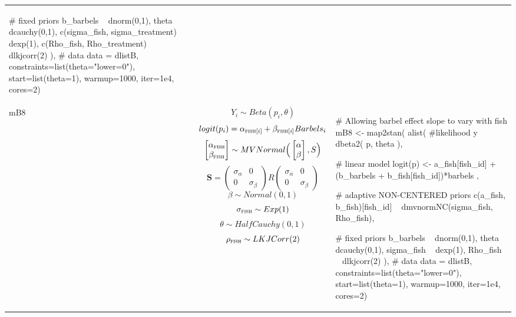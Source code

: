 \begin{longtable}{p{} |p{} |p{} }
{\begin{mylist}
    # fixed priors
    b_barbels ~ dnorm(0,1),
    theta ~ dcauchy(0,1),
    c(sigma_fish, sigma_treatment) ~ dexp(1),
    c(Rho_fish, Rho_treatment) ~ dlkjcorr(2)
  ),
  # data
  data = dlistB,
  constraints=list(theta="lower=0"),
  start=list(theta=1), warmup=1000, iter=1e4, cores=2) \end{mylist}}
  \\ %
mB8& %
$$ Y_i \sim Beta(p_i, \theta) $$
\small $$ logit(p_i) =  \alpha_{\textsc{fish}[i]} + \beta_{\textsc{fish}[i]}Barbels_i$$
$$
\begin{bmatrix}
\alpha_{\textsc{fish}} \\
\beta_{\textsc{fish}} \\
\end{bmatrix} \sim MVNormal \Big(
\begin{bmatrix}
\alpha \\
\beta \\
\end{bmatrix}, S \Big)
$$
$$
\mathbf{S} = \left( \begin{array}{cc}
\sigma_\alpha & 0 \\
0 & \sigma_\beta
\end{array} \right) R \left( \begin{array}{cc}
\sigma_\alpha & 0 \\
0 & \sigma_\beta
\end{array} \right)
$$
$$ \beta \sim Normal(0,1) $$
$$ \sigma_{\textsc{fish}} \sim Exp(1) $$
$$ \theta \sim HalfCauchy(0, 1) $$
$$ \rho_{\textsc{fish}} \sim LKJCorr(2) $$
&
{\begin{mylist} %

#  Allowing barbel effect slope to vary with fish
mB8 <- map2stan(
  alist(
    #likelihood
    y ~ dbeta2( p, theta ),
    
    # linear model
    logit(p) <- a_fish[fish_id] + (b_barbels + 
    b_fish[fish_id])*barbels ,
    
    # adaptive NON-CENTERED priors 
    c(a_fish, b_fish)[fish_id] ~ 
    dmvnormNC(sigma_fish, Rho_fish),
    
    # fixed priors
    b_barbels ~ dnorm(0,1),
    theta ~ dcauchy(0,1),
    sigma_fish ~ dexp(1),
    Rho_fish ~ dlkjcorr(2)
  ),
  # data
  data = dlistB,
  constraints=list(theta="lower=0"),
  start=list(theta=1), warmup=1000, iter=1e4, cores=2) \end{mylist}}
  \\ %
\end{longtable}
